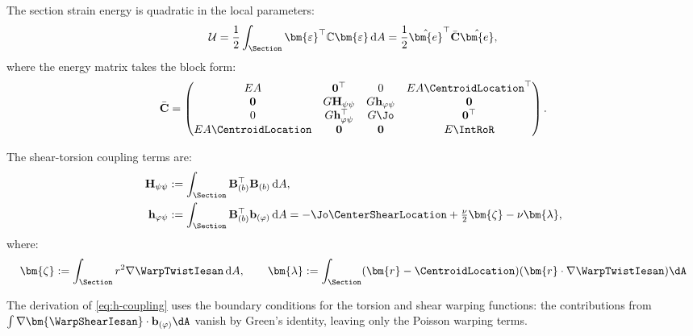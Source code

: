 The section strain energy is quadratic in the local parameters:
\begin{equation}
\mathcal{U} = \frac{1}{2}\int_\Section \bm{\varepsilon}^\top \mathbb{C} \bm{\varepsilon} \, \mathrm{d}A 
= \frac{1}{2}\hat{\bm{e}}^\top \bar{\mathbf{C}} \hat{\bm{e}},
\end{equation}
where the energy matrix takes the block form:
\begin{equation}
\bar{\mathbf{C}} = \begin{pmatrix}
EA & \mathbf{0}^\top & 0 & EA\CentroidLocation^\top \\
\mathbf{0} & G\mathbf{H}_{\psi\psi} & G\mathbf{h}_{\varphi\psi} & \mathbf{0} \\
0 & G\mathbf{h}_{\varphi\psi}^\top & G\Jo & \mathbf{0}^\top \\
EA\CentroidLocation & \mathbf{0} & \mathbf{0} & E\IntRoR
\end{pmatrix}.
\label{eq:energy-matrix}
\end{equation}

The shear-torsion coupling terms are:
\begin{align}
\mathbf{H}_{\psi\psi} &:= \int_\Section \mathbf{B}_{(b)}^\top \mathbf{B}_{(b)} \, \mathrm{d}A, \\
\mathbf{h}_{\varphi\psi} &:= \int_\Section \mathbf{B}_{(b)}^\top \mathbf{b}_{(\varphi)} \, \mathrm{d}A 
= -\Jo\CenterShearLocation + \tfrac{\nu}{2}\bm{\zeta} - \nu\bm{\lambda},
\label{eq:h-coupling}
\end{align}
where:
\begin{equation}
\bm{\zeta} := \int_\Section r^2 \nabla\WarpTwistIesan \, \mathrm{d}A, \qquad 
\bm{\lambda} := \int_\Section (\bm{r} - \CentroidLocation)(\bm{r} \cdot \nabla\WarpTwistIesan) \dA
\label{eq:def-zeta-lambda}
\end{equation}

The derivation of \eqref{eq:h-coupling} uses the boundary conditions for the 
torsion and shear warping functions: the contributions from 
$\int \nabla\bm{\WarpShearIesan} \cdot \mathbf{b}_{(\varphi)} \dA$ vanish by 
Green's identity, leaving only the Poisson warping terms.


